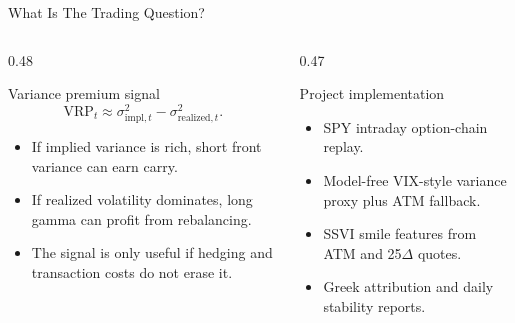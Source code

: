 \documentclass[11pt,aspectratio=169]{beamer}
\newcommand{\1}{\mathbf{1}}
\newcommand{\VRP}{\mathrm{VRP}}
\begin{document}
\begin{frame}{What Is The Trading Question?}
    \small
    \begin{columns}[T,onlytextwidth]
    \begin{column}{0.48\textwidth}
    \begin{block}{Variance premium signal}
    \[
        \VRP_t
        \approx
        \sigma^2_{\mathrm{impl},t}
        -
        \sigma^2_{\mathrm{realized},t}.
    \]
    \end{block}
    \begin{itemize}
        \item If implied variance is rich, short front variance can earn carry.
        \item If realized volatility dominates, long gamma can profit from rebalancing.
        \item The signal is only useful if hedging and transaction costs do not erase it.
    \end{itemize}
    \end{column}
    \begin{column}{0.47\textwidth}
    \begin{block}{Project implementation}
    \begin{itemize}
        \item SPY intraday option-chain replay.
        \item Model-free VIX-style variance proxy plus ATM fallback.
        \item SSVI smile features from ATM and 25$\Delta$ quotes.
        \item Greek attribution and daily stability reports.
    \end{itemize}
    \end{block}
    \end{column}
    \end{columns}
\end{frame}
\end{document}
